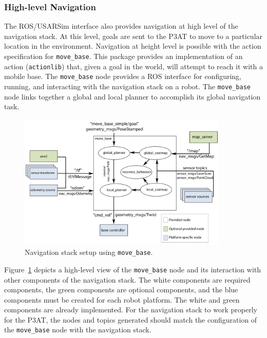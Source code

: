 \subsubsection*{High-level Navigation}
The ROS/USARSim interface also provides navigation at high level of the navigation stack. At this level, goals are sent to the P3AT to move to a particular location in the environment. Navigation at height level is possible with the action specification for \texttt{move\_base}. This package provides an implementation of an action (\texttt{actionlib}) that, given a goal in the world, will attempt to reach it with a mobile base. The \texttt{move\_base} node provides a ROS interface for configuring, running, and interacting with the navigation stack on a robot. The \texttt{move\_base} node links together a global and local planner to accomplish its global navigation task.

\begin{figure}[t!]
\centering
\includegraphics[width=10cm]{Figures/Misc/Navigation_Stack.jpg}
\caption{Navigation stack setup using \texttt{move\_base}.}\label{fig:navigation_stack}
\end{figure}

Figure~\ref{fig:navigation_stack} depicts a high-level view of the \texttt{move\_base} node and its interaction with other components of the navigation stack. The white components are required components, the green components are optional components, and the blue components must be created for each robot platform. The white and green components are already implemented. For the navigation stack to work properly for the P3AT, the nodes and topics generated should match the configuration of the \texttt{move\_base} node with the navigation stack.


